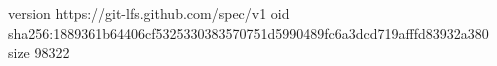 version https://git-lfs.github.com/spec/v1
oid sha256:1889361b64406cf5325330383570751d5990489fc6a3dcd719afffd83932a380
size 98322
